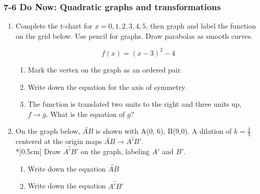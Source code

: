 \documentclass[12pt, twoside]{article}
\begin{document}
\subsubsection*{7-6 Do Now: Quadratic graphs and transformations}
  \begin{enumerate}

\item Complete the t-chart for $x=0,1,2,3,4,5$, then graph and label the function on the grid below. Use pencil for graphs. Draw parabolas as smooth curves.

    \[f(x) = (x-3)^2-4\]


  \begin{center} %
  \end{center}

\begin{enumerate}
  \item Mark the vertex on the graph as an ordered pair.
  \item Write down the equation for the axis of symmetry. \vspace{2cm}
  \item The function is translated two units to the right and three units up, $f \rightarrow g$. What is the equation of $g$?
\end{enumerate}


\newpage

\item On the graph below, $\overleftrightarrow{AB}$ is shown with A(0, 6), B(9,0). A dilation of $k=\frac{2}{3}$ centered at the origin maps $\overleftrightarrow{AB} \rightarrow \overleftrightarrow{A'B'}$.\\*[0.5cm]
  Draw $\overleftrightarrow{A'B'}$ on the graph, labeling $A'$ and $B'$.
    \begin{center}
    \end{center}
      \vspace{1cm}
    \begin{enumerate}
      \item Write down the equation $\overleftrightarrow{AB}$ \vspace{2cm}
      \item Write down the equation $\overleftrightarrow{A'B'}$
    \end{enumerate}

\end{enumerate}
\end{document}
